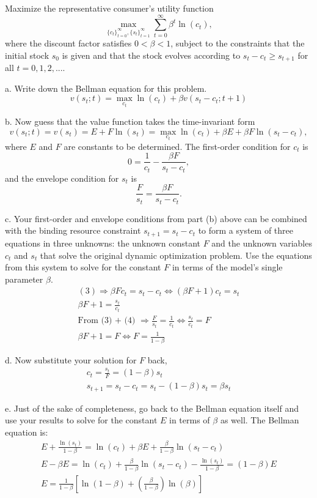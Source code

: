 \documentclass[12pt]{article}
\begin{document}
Maximize the representative consumer's utility function
$$
\max_{\{c_t\}^{\infty}_{t=0}, \{s_t\}^{\infty}_{t=1}} \sum_{t=0}^{\infty} \beta^{t} \ln(c_{t}),
$$
where the discount factor satisfies $0<\beta<1$, subject to the constraints that the initial stock $s_{0}$ is given and that the stock evolves according to $s_{t}-c_{t} \geq s_{t+1}$ for all $t=0,1,2,...$.
\begin{description}
\item a. Write down the Bellman equation for this problem.
$$
v(s_t;t) = \max_{c_t}\ln(c_t) + \beta v(s_t - c_t;t+1)
$$
\item b. Now guess that the value function takes the time-invariant form
$$
v(s_{t};t) = v(s_{t}) = E + F \ln(s_{t}) = \max_{c_t}\ln(c_t) + \beta E + \beta F\ln(s_t - c_t),
$$
where $E$ and $F$ are constants to be determined. The first-order condition for $c_{t}$ is
\begin{equation}
0 = \frac{1}{c_t} - \frac{\beta F}{s_t-c_t}, 
\end{equation}
and the envelope condition for $s_{t}$ is 
\begin{equation}
\frac{F}{s_t} = \frac{\beta F}{s_t-c_t}. 
\end{equation}
\item c. Your first-order and envelope conditions from part (b) above can be combined with the binding resource constraint
$s_{t+1} = s_{t} - c_{t}$ to form a system of three equations in three unknowns: the unknown constant $F$ and the unknown variables $c_{t}$ and $s_{t}$ that solve the original dynamic optimization problem. Use the equations from this system to solve for the constant $F$ in terms of the model's single parameter $\beta$.
\begin{gather*}
(3) \Rightarrow \beta Fc_t = s_t-c_t \iff (\beta F + 1)c_t = s_t \\ 
\beta F + 1 = \frac{s_t}{c_t} \\ 
\text{From (3) + (4) } \Rightarrow \frac{F}{s_t} = \frac{1}{c_t} \iff \frac{s_t}{c_t} = F \\ 
\beta F + 1 = F \iff F = \frac{1}{1-\beta}
\end{gather*}
\item d. Now substitute your solution for $F$ back, 
\begin{gather*}
c_t = \frac{s_t}{F} = (1-\beta)s_t \\ 
s_{t+1} = s_t - c_t = s_t - (1-\beta)s_t = \beta s_t
\end{gather*}
\item e. Just of the sake of completeness, go back to the Bellman equation itself and use your results to solve for the constant $E$ in terms of $\beta$ as well. The Bellman equation is: 
\begin{gather*} 
E + \frac{\ln(s_t)}{1-\beta} = \ln(c_t) + \beta E + \frac{\beta}{1-\beta} \ln(s_t - c_t)   \\ 
E - \beta E = \ln(c_t) + \frac{\beta}{1-\beta} \ln(s_t - c_t) - \frac{\ln(s_t)}{1-\beta} = (1-\beta)E    \\ 
E = \frac{1}{1-\beta}[\ln(1-\beta) + (\frac{\beta}{1-\beta})\ln(\beta)]
\end{gather*}

\end{description}
\end{document}
